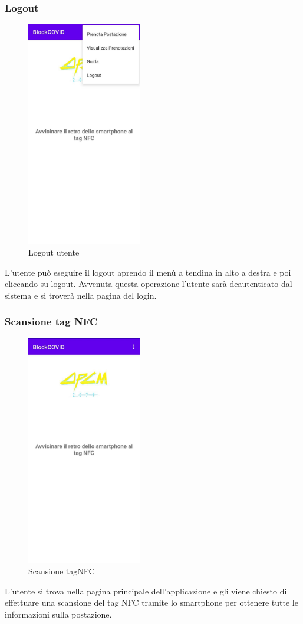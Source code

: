 	\subsubsection{Logout}
	\begin{figure}[H]
		\centering
		\includegraphics[width=5cm]{res/images/menuATendina.png}
		\caption{Logout utente}
	\end{figure}
	L'utente può eseguire il logout aprendo il menù a tendina in alto a destra e poi cliccando su logout. Avvenuta questa operazione l'utente sarà deautenticato dal sistema e si troverà nella pagina del login.
	
	\subsubsection{Scansione tag NFC}
	\begin{figure}[H]
		\centering
		\includegraphics[width=5cm]{res/images/avvicinaSmartphone.png}
		\caption{Scansione tagNFC}
	\end{figure}
	L'utente si trova nella pagina principale dell'applicazione e gli viene chiesto di effettuare una scansione del tag NFC tramite lo smartphone per ottenere tutte le informazioni sulla postazione.
